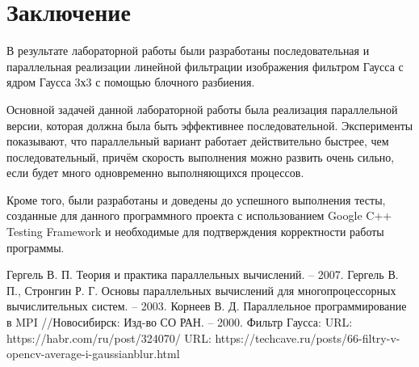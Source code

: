 \documentclass{report}
\begin{document}
\section*{Заключение}
В результате лабораторной работы были разработаны последовательная и параллельная реализации линейной фильтрации изображения фильтром Гаусса с ядром Гаусса 3х3 с помощью блочного разбиения.
\par Основной задачей данной лабораторной работы была реализация параллельной версии, которая должна была быть эффективнее последовательной. Эксперименты показывают, что параллельный вариант работает действительно быстрее, чем последовательный, причём скорость выполнения можно развить очень сильно, если будет много одновременно выполняющихся процессов.
\par Кроме того, были разработаны и доведены до успешного выполнения тесты, созданные для данного программного проекта с использованием Google C++ Testing Framework и необходимые для подтверждения корректности работы программы.
\newpage
\begin{thebibliography}{1}
Гергель В. П. Теория и практика параллельных вычислений. – 2007. 
Гергель В. П., Стронгин Р. Г. Основы параллельных вычислений для многопроцессорных вычислительных систем. – 2003.
Корнеев В. Д. Параллельное программирование в MPI //Новосибирск: Изд-во СО РАН. – 2000.
Фильтр Гаусса: URL: https://habr.com/ru/post/324070/
URL: https://techcave.ru/posts/66-filtry-v-opencv-average-i-gaussianblur.html
\end{thebibliography}
\newpage

\end{document}
